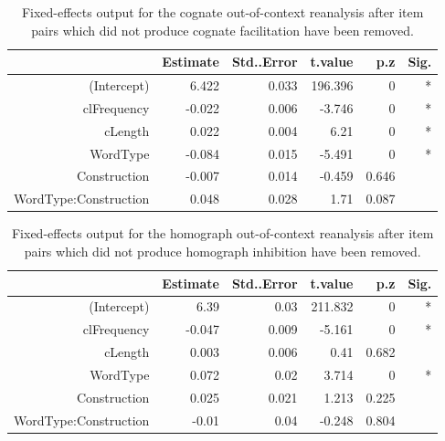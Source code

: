 \begin{landscape}
\begin{table}[htbp]
  \centering
  \caption{Fixed-effects output for the cognate out-of-context reanalysis after  item pairs which did not produce cognate facilitation have been removed.}
    \begin{tabular}{rrrrrr}
    \toprule
          & Estimate & Std..Error & t.value & p.z   & Sig. \\
    \midrule
    (Intercept) & 6.422 & 0.033 & 196.396 & 0     & * \\
    clFrequency & -0.022 & 0.006 & -3.746 & 0     & * \\
    cLength & 0.022 & 0.004 & 6.21  & 0     & * \\
    WordType & -0.084 & 0.015 & -5.491 & 0     & * \\
    Construction & -0.007 & 0.014 & -0.459 & 0.646 &  \\
    WordType:Construction & 0.048 & 0.028 & 1.71  & 0.087 &  \\
    \bottomrule
    \end{tabular}%
  \label{tab:ocon.cog.reanl}%
\end{table}%



\begin{table}[htbp]
  \centering
  \caption{Fixed-effects output for the homograph out-of-context reanalysis after  item pairs which did not produce homograph inhibition have been removed.}
    \begin{tabular}{rrrrrr}
    \toprule
          & Estimate & Std..Error & t.value & p.z   & Sig. \\
    \midrule
    (Intercept) & 6.39  & 0.03  & 211.832 & 0     & * \\
    clFrequency & -0.047 & 0.009 & -5.161 & 0     & * \\
    cLength & 0.003 & 0.006 & 0.41  & 0.682 &  \\
    WordType & 0.072 & 0.02  & 3.714 & 0     & * \\
    Construction & 0.025 & 0.021 & 1.213 & 0.225 &  \\
    WordType:Construction & -0.01 & 0.04  & -0.248 & 0.804 &  \\
    \bottomrule
    \end{tabular}%
  \label{tab:ocon.hom.reanl}%
\end{table}%
\end{landscape}



